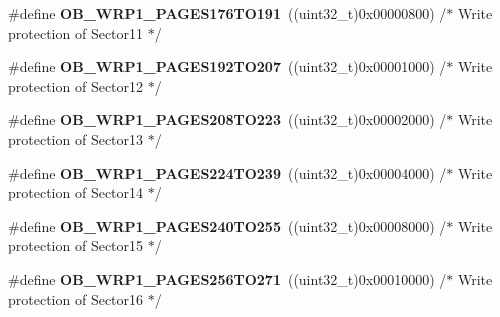 \begin{DoxyCompactItemize}
\item 
\hypertarget{group___f_l_a_s_h_ex___option___bytes___write___protection1_gab8b61ded24cbe5504af23b06b8a8fff3}{\#define {\bfseries O\-B\-\_\-\-W\-R\-P1\-\_\-\-P\-A\-G\-E\-S176\-T\-O191}~((uint32\-\_\-t)0x00000800) /$\ast$ Write protection of Sector11 $\ast$/}\label{group___f_l_a_s_h_ex___option___bytes___write___protection1_gab8b61ded24cbe5504af23b06b8a8fff3}

\item 
\hypertarget{group___f_l_a_s_h_ex___option___bytes___write___protection1_ga276127fff175fcd29a1d6969ede61aae}{\#define {\bfseries O\-B\-\_\-\-W\-R\-P1\-\_\-\-P\-A\-G\-E\-S192\-T\-O207}~((uint32\-\_\-t)0x00001000) /$\ast$ Write protection of Sector12 $\ast$/}\label{group___f_l_a_s_h_ex___option___bytes___write___protection1_ga276127fff175fcd29a1d6969ede61aae}

\item 
\hypertarget{group___f_l_a_s_h_ex___option___bytes___write___protection1_ga6a4314b828da6d71a8cb6606d935a7bb}{\#define {\bfseries O\-B\-\_\-\-W\-R\-P1\-\_\-\-P\-A\-G\-E\-S208\-T\-O223}~((uint32\-\_\-t)0x00002000) /$\ast$ Write protection of Sector13 $\ast$/}\label{group___f_l_a_s_h_ex___option___bytes___write___protection1_ga6a4314b828da6d71a8cb6606d935a7bb}

\item 
\hypertarget{group___f_l_a_s_h_ex___option___bytes___write___protection1_gaef13309a73b31bc6b0c8ca37f5218725}{\#define {\bfseries O\-B\-\_\-\-W\-R\-P1\-\_\-\-P\-A\-G\-E\-S224\-T\-O239}~((uint32\-\_\-t)0x00004000) /$\ast$ Write protection of Sector14 $\ast$/}\label{group___f_l_a_s_h_ex___option___bytes___write___protection1_gaef13309a73b31bc6b0c8ca37f5218725}

\item 
\hypertarget{group___f_l_a_s_h_ex___option___bytes___write___protection1_ga82c2be21d61b00812544d0e81576f736}{\#define {\bfseries O\-B\-\_\-\-W\-R\-P1\-\_\-\-P\-A\-G\-E\-S240\-T\-O255}~((uint32\-\_\-t)0x00008000) /$\ast$ Write protection of Sector15 $\ast$/}\label{group___f_l_a_s_h_ex___option___bytes___write___protection1_ga82c2be21d61b00812544d0e81576f736}

\item 
\hypertarget{group___f_l_a_s_h_ex___option___bytes___write___protection1_gad11fa60c63c1c208b90706d974bc1741}{\#define {\bfseries O\-B\-\_\-\-W\-R\-P1\-\_\-\-P\-A\-G\-E\-S256\-T\-O271}~((uint32\-\_\-t)0x00010000) /$\ast$ Write protection of Sector16 $\ast$/}\label{group___f_l_a_s_h_ex___option___bytes___write___protection1_gad11fa60c63c1c208b90706d974bc1741}


\end{DoxyCompactItemize}
